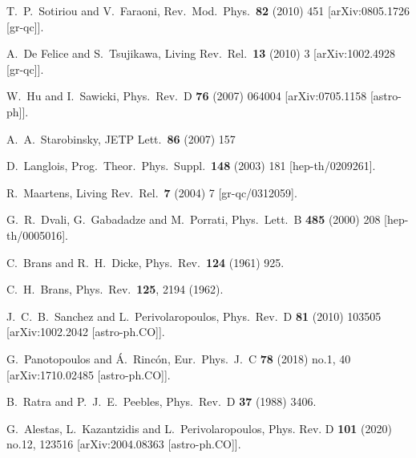 \documentclass[aps,prd,amsmath,amssymb]{revtex4}
\begin{document}
\begin{thebibliography}{99}
 T.~P.~Sotiriou and V.~Faraoni,
  Rev.\ Mod.\ Phys.\  {\bf 82} (2010) 451
  [arXiv:0805.1726 [gr-qc]].

 A.~De Felice and S.~Tsujikawa,
  Living Rev.\ Rel.\  {\bf 13} (2010) 3
  [arXiv:1002.4928 [gr-qc]].

 W.~Hu and I.~Sawicki,
  Phys.\ Rev.\ D {\bf 76} (2007) 064004
  [arXiv:0705.1158 [astro-ph]].

 A.~A.~Starobinsky,
  JETP Lett.\  {\bf 86} (2007) 157
 
 D.~Langlois,
  Prog.\ Theor.\ Phys.\ Suppl.\  {\bf 148} (2003) 181
  [hep-th/0209261].

 R.~Maartens,
  Living Rev.\ Rel.\  {\bf 7} (2004) 7
  [gr-qc/0312059].

 G.~R.~Dvali, G.~Gabadadze and M.~Porrati,
  Phys.\ Lett.\ B {\bf 485} (2000) 208
[hep-th/0005016].

 C.~Brans and R.~H.~Dicke,
  Phys.\ Rev.\  {\bf 124} (1961) 925.
  
 C.~H.~Brans,
  Phys.\ Rev.\  {\bf 125}, 2194 (1962).
  
 J.~C.~B.~Sanchez and L.~Perivolaropoulos,
  Phys.\ Rev.\ D {\bf 81} (2010) 103505
[arXiv:1002.2042 [astro-ph.CO]].

 G.~Panotopoulos and \'A.~Rinc\'on,
  Eur.\ Phys.\ J.\ C {\bf 78} (2018) no.1,  40
  [arXiv:1710.02485 [astro-ph.CO]].
  
 B.~Ratra and P.~J.~E.~Peebles,
  Phys.\ Rev.\ D {\bf 37} (1988) 3406.

 G.~Alestas, L.~Kazantzidis and L.~Perivolaropoulos,
Phys. Rev. D \textbf{101} (2020) no.12, 123516
[arXiv:2004.08363 [astro-ph.CO]].  
  

\end{thebibliography}
\end{document}

